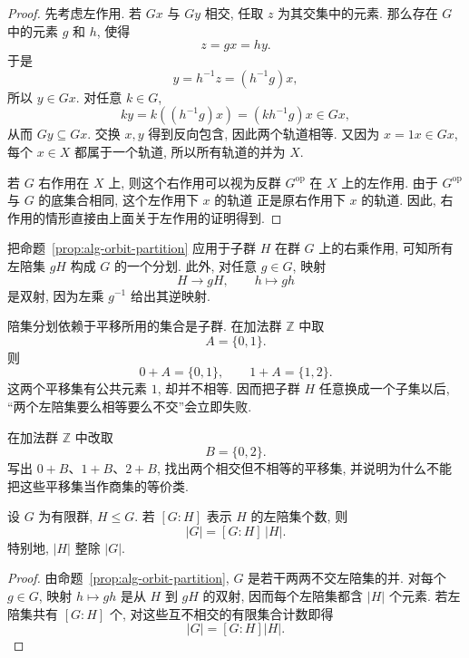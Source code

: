 \documentclass[usesamecnt, thmcnt=section, lang=cn, newtx, 10pt, scheme=chinese]{elegantbook}
\begin{document}
\begin{proof}
先考虑左作用. 若 $G x$ 与 $G y$ 相交, 任取 $z$ 为其交集中的元素. 那么存在 $G$ 中的元素 $g$ 和 $h$, 使得
\[
 z=g x=h y.
\]
于是
\[
 y=h^{-1} z=(h^{-1}g) x,
\]
所以 $y\in G x$. 对任意 $k\in G$,
\[
 k y=k((h^{-1}g) x)=(kh^{-1}g) x\in G x,
\]
从而 $G y\subseteq G x$. 交换 $x,y$ 得到反向包含, 因此两个轨道相等. 又因为 $x=1 x\in G x$, 每个 $x\in X$ 都属于一个轨道, 所以所有轨道的并为 $X$.

若 $G$ 右作用在 $X$ 上, 则这个右作用可以视为反群 $G^{\mathrm{op}}$ 在 $X$ 上的左作用. 由于 $G^{\mathrm{op}}$ 与 $G$ 的底集合相同, 这个左作用下 $x$ 的轨道
正是原右作用下 $x$ 的轨道. 因此, 右作用的情形直接由上面关于左作用的证明得到.
\end{proof}

把命题~\ref{prop:alg-orbit-partition} 应用于子群 $H$ 在群 $G$ 上的右乘作用, 可知所有左陪集 $gH$ 构成 $G$ 的一个分划. 此外, 对任意 $g\in G$, 映射
\[
 H\longrightarrow gH,
 \qquad
 h\longmapsto gh
\]
是双射, 因为左乘 $g^{-1}$ 给出其逆映射.

\begin{instance}
陪集分划依赖于平移所用的集合是子群. 在加法群 $\mathbb Z$ 中取
\[
 A=\{0,1\}.
\]
则
\[
 0+A=\{0,1\},
 \qquad
 1+A=\{1,2\}.
\]
这两个平移集有公共元素 $1$, 却并不相等. 因而把子群 $H$ 任意换成一个子集以后, ``两个左陪集要么相等要么不交''会立即失败.
\end{instance}

\begin{exercise}\label{ex:alg-coset-subgroup}
在加法群 $\mathbb Z$ 中改取
\[
 B=\{0,2\}.
\]
写出 $0+B$、$1+B$、$2+B$, 找出两个相交但不相等的平移集, 并说明为什么不能把这些平移集当作商集的等价类.
\end{exercise}

\begin{theorem}[Lagrange 定理]\label{thm:alg-lagrange}
设 $G$ 为有限群, $H\leq G$. 若 $[G:H]$ 表示 $H$ 的左陪集个数, 则
\[
 |G|=[G:H]\,|H|.
\]
特别地, $|H|$ 整除 $|G|$.

\end{theorem}

\begin{proof}
由命题~\ref{prop:alg-orbit-partition}, $G$ 是若干两两不交左陪集的并. 对每个 $g\in G$, 映射 $h\mapsto gh$ 是从 $H$ 到 $gH$ 的双射, 因而每个左陪集都含 $|H|$ 个元素. 若左陪集共有 $[G:H]$ 个, 对这些互不相交的有限集合计数即得
\[
 |G|=[G:H]|H|.
\]
\end{proof}
\end{document}

